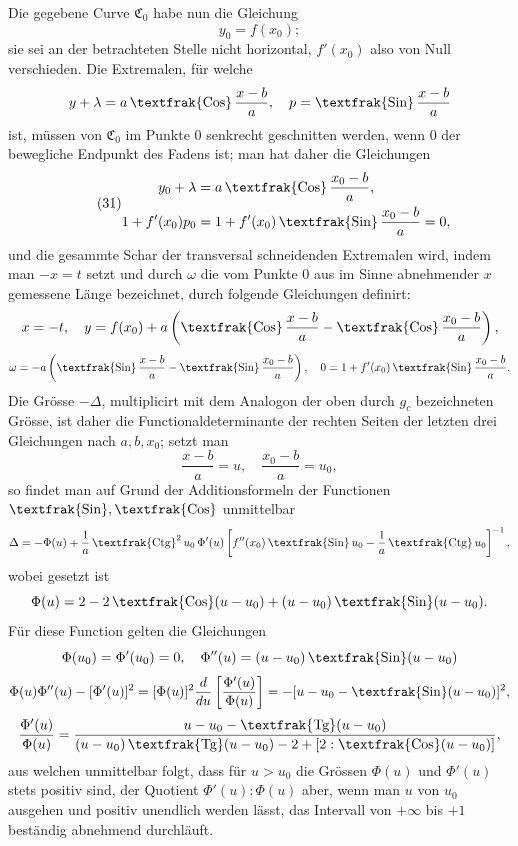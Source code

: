 \documentclass[11pt,a4paper,leqno]{article}
\newcommand{\Cof}{\mathop{\text{\textfrak{Cos}}}\nolimits}
\newcommand{\Sin}{\mathop{\text{\textfrak{Sin}}}\nolimits}
\newcommand{\Tg}{\mathop{\text{\textfrak{Tg}}}\nolimits}
\newcommand{\Ctg}{\mathop{\text{\textfrak{Ctg}}}\nolimits}
\begin{document}
Die gegebene Curve $\mathfrak{C}_0$ habe nun die Gleichung
\[
y_0=f(x_0);
\]
sie sei an der betrachteten Stelle nicht horizontal, $f'(x_0)$ also von Null verschieden. Die Extremalen, für welche
\[
y+\lambda=a\Cof\frac{x-b}{a},\quad p=\Sin\frac{x-b}{a}
\]
ist, müssen von $\mathfrak{C}_0$ im Punkte 0 senkrecht geschnitten werden, wenn 0 der bewegliche Endpunkt des Fadens ist; man hat daher die Gleichungen
\begin{equation}\tag{31}
\begin{aligned}
y_0+\lambda&=a\Cof\frac{x_0-b}{a},\\
1+f'(x_0)p_0&=1+f'(x_0)\Sin\frac{x_0-b}{a}=0,
\end{aligned}
\end{equation}
und die gesammte Schar der transversal schneidenden Extremalen wird, indem man $-x=t$ setzt und durch $\omega$ die vom Punkte 0 aus im Sinne abnehmender $x$ gemessene Länge bezeichnet, durch folgende Gleichungen definirt:
\[
x=-t,\quad y=f(x_0)+a\left(\Cof\frac{x-b}{a}-\Cof\frac{x_0-b}{a}\right),
\]
\[
\omega=-a\left(\Sin\frac{x-b}{a}-\Sin\frac{x_0-b}{a}\right),\quad
0=1+f'(x_0)\Sin\frac{x_0-b}{a}.
\]
Die Grösse $-\Delta$, multiplicirt mit dem Analogon der oben durch $g_c$ bezeichneten Grösse, ist daher die Functionaldeterminante der rechten Seiten der letzten drei Gleichungen nach $a,b,x_0$; setzt man
\[
\frac{x-b}{a}=u,
\quad
\frac{x_0-b}{a}=u_0,
\]
so findet man auf Grund der Additionsformeln der Functionen $\Sin,\Cof$ unmittelbar
\[
\Delta=-\Phi(u)+\frac{1}{a}\Ctg^2u_0\,\Phi'(u)\left[f''(x_0)\Sin u_0-\frac{1}{a}\Ctg u_0\right]^{-1},
\]
wobei gesetzt ist
\[
\Phi(u)=2-2\Cof(u-u_0)+(u-u_0)\Sin(u-u_0).
\]
Für diese Function gelten die Gleichungen
\[
\Phi(u_0)=\Phi'(u_0)=0,\quad \Phi''(u)=(u-u_0)\Sin(u-u_0)
\]
\[
\Phi(u)\Phi''(u)-[\Phi'(u)]^2=[\Phi(u)]^2\frac{d}{du}\left[\frac{\Phi'(u)}{\Phi(u)}\right]
= -[u-u_0-\Sin(u-u_0)]^2,
\]
\[
\frac{\Phi'(u)}{\Phi(u)}=\frac{u-u_0-\Tg(u-u_0)}{(u-u_0)\Tg(u-u_0)-2+[2:\Cof(u-u_0)]},
\]
aus welchen unmittelbar folgt, dass für $u>u_0$ die Grössen $\Phi(u)$ und $\Phi'(u)$ stets positiv sind, der Quotient $\Phi'(u):\Phi(u)$ aber, wenn man $u$ von $u_0$ ausgehen und positiv unendlich werden lässt, das Intervall von $+\infty$ bis $+1$ beständig abnehmend durchläuft.
\end{document}
